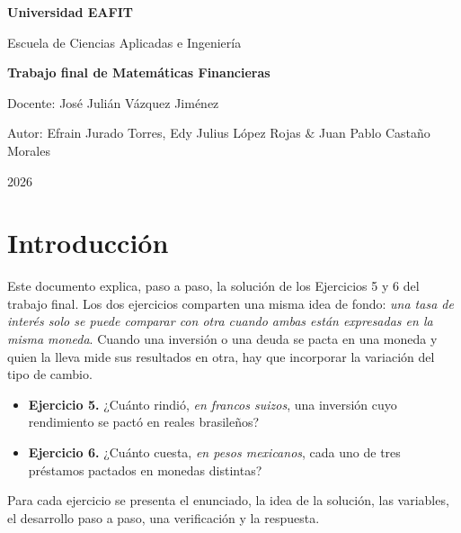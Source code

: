 \documentclass[11pt]{article}
\begin{document}
\begin{titlepage}
   \begingroup\centering
      {\LARGE \textbf{Universidad EAFIT}\par}
      \vspace{1cm}
      {\Large Escuela de Ciencias Aplicadas e Ingeniería\par}
      \vspace{3cm}
      {\Huge \textbf{Trabajo final de Matemáticas Financieras}\par}
      \vspace{3cm}
      {\Large Docente:  José Julián Vázquez Jiménez\par}
      \vfill
      {\Large Autor: Efrain Jurado Torres, Edy Julius López Rojas $\&$ Juan Pablo Castaño Morales\par}
      \vfill
      {\Large 2026 \par}

   \endgroup
\end{titlepage}

\tableofcontents
\newpage

\section{Introducci\'on}

Este documento explica, paso a paso, la soluci\'on de los Ejercicios 5 y 6 del trabajo final. Los dos ejercicios comparten una misma idea de fondo: \emph{una tasa de inter\'es solo se puede comparar con otra cuando ambas est\'an expresadas en la misma moneda}. Cuando una inversi\'on o una deuda se pacta en una moneda y quien la lleva mide sus resultados en otra, hay que incorporar la variaci\'on del tipo de cambio.

\begin{itemize}
\item \textbf{Ejercicio 5.} ¿Cu\'anto rindi\'o, \emph{en francos suizos}, una inversi\'on cuyo rendimiento se pact\'o en reales brasile\~nos?
\item \textbf{Ejercicio 6.} ¿Cu\'anto cuesta, \emph{en pesos mexicanos}, cada uno de tres pr\'estamos pactados en monedas distintas?
\end{itemize}

Para cada ejercicio se presenta el enunciado, la idea de la soluci\'on, las variables, el desarrollo paso a paso, una verificaci\'on y la respuesta.
\end{document}
